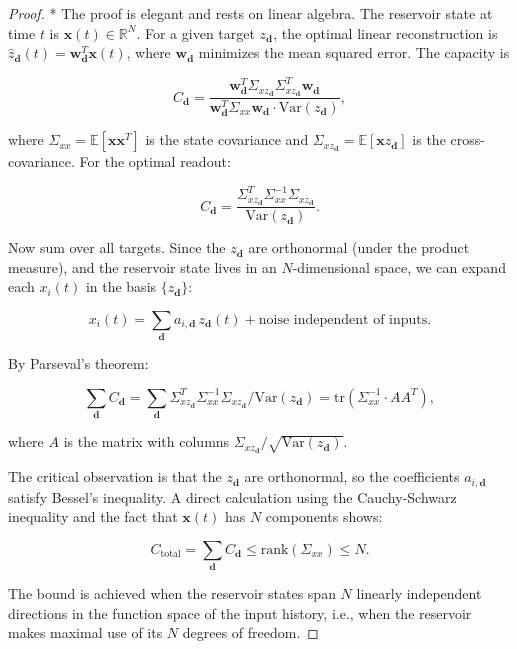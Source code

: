 \begin{proof}
* The proof is elegant and rests on linear algebra. The reservoir state at time
$t$ is $\mathbf{x}(t) \in \mathbb{R}^N$. For a given target $z_{\mathbf{d}}$, the
optimal linear reconstruction is $\hat{z}_{\mathbf{d}}(t) = \mathbf{w}_{\mathbf{d}}^T \mathbf{x}(t)$,
where $\mathbf{w}_{\mathbf{d}}$ minimizes the mean squared error. The capacity is

\[
C_{\mathbf{d}} = \frac{\mathbf{w}_{\mathbf{d}}^T \Sigma_{xz_{\mathbf{d}}} \Sigma_{xz_{\mathbf{d}}}^T \mathbf{w}_{\mathbf{d}}}{\mathbf{w}_{\mathbf{d}}^T \Sigma_{xx} \mathbf{w}_{\mathbf{d}} \cdot \text{Var}(z_{\mathbf{d}})},
\]

where $\Sigma_{xx} = \mathbb{E}[\mathbf{x}\mathbf{x}^T]$ is the state covariance and
$\Sigma_{xz_{\mathbf{d}}} = \mathbb{E}[\mathbf{x} z_{\mathbf{d}}]$ is the
cross-covariance. For the optimal readout:

\[
C_{\mathbf{d}} = \frac{\Sigma_{xz_{\mathbf{d}}}^T \Sigma_{xx}^{-1} \Sigma_{xz_{\mathbf{d}}}}{\text{Var}(z_{\mathbf{d}})}.
\]

Now sum over all targets. Since the $z_{\mathbf{d}}$ are orthonormal (under the
product measure), and the reservoir state lives in an $N$-dimensional space, we can
expand each $x_i(t)$ in the basis $\{z_{\mathbf{d}}\}$:

\[
x_i(t) = \sum_{\mathbf{d}} a_{i,\mathbf{d}}\, z_{\mathbf{d}}(t) + \text{noise independent of inputs}.
\]

By Parseval's theorem:

\[
\sum_{\mathbf{d}} C_{\mathbf{d}} = \sum_{\mathbf{d}} \Sigma_{xz_{\mathbf{d}}}^T \Sigma_{xx}^{-1} \Sigma_{xz_{\mathbf{d}}} / \text{Var}(z_{\mathbf{d}}) = \text{tr}(\Sigma_{xx}^{-1} \cdot A A^T),
\]

where $A$ is the matrix with columns $\Sigma_{xz_{\mathbf{d}}} / \sqrt{\text{Var}(z_{\mathbf{d}})}$.

The critical observation is that the $z_{\mathbf{d}}$ are orthonormal, so the
coefficients $a_{i,\mathbf{d}}$ satisfy Bessel's inequality. A direct calculation using the
Cauchy-Schwarz inequality and the fact that $\mathbf{x}(t)$ has $N$ components shows:

\[
C_{\text{total}} = \sum_{\mathbf{d}} C_{\mathbf{d}} \leq \text{rank}(\Sigma_{xx}) \leq N.
\]

The bound is achieved when the reservoir states span $N$ linearly independent
directions in the function space of the input history, i.e., when the reservoir makes
maximal use of its $N$ degrees of freedom.
\end{proof}


